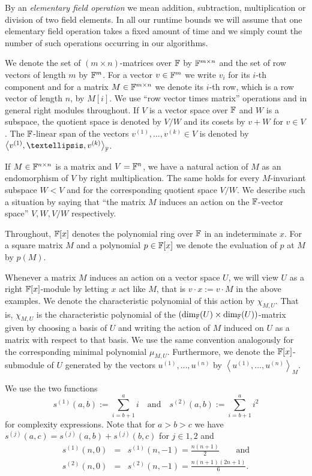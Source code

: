 By an \emph{elementary field operation} 
%
we mean addition, subtraction, multiplication or division of two field 
elements.
In all our runtime bounds we will assume that one elementary
field operation takes a fixed amount of time and we simply count
the number of such operations occurring in our algorithms.

We denote the set of $(m \times n)$-matrices over $\mathbb{F}$ by $\mathbb{F}^{m \times n}$
and the set of row vectors of length $m$ by $\mathbb{F}^m$. For a vector
$v \in \mathbb{F}^m$ we write $v_i$ for its $i$-th component and for a matrix 
$M \in \mathbb{F}^{m \times n}$ we denote its $i$-th row, which is
a row vector of length $n$, by $M[i]$. We use ``row vector
times matrix'' operations and in general right modules throughout.
If $V$ is a vector space over $\mathbb{F}$ and $W$ is a subspace, the
quotient space is denoted by $V/W$ and its cosets by
$v+W$ for $v \in V$. The $\mathbb{F}$-linear span of the vectors
$v^{(1)}, \ldots, v^{(k)} \in V$ is denoted by 
$\left< v^{(1)}, \ldots, v^{(k)}\right>_\F$.

If $M \in \mathbb{F}^{n \times n}$ is a matrix and $V = \mathbb{F}^n$, we have a
natural action of $M$ as an endomorphism of $V$ by right multiplication.
The same holds for every $M$-invariant subspace $W < V$ and for
the corresponding quotient space $V/W$. We describe such a situation
by saying that ``the matrix $M$ induces an action on the $\mathbb{F}$-vector space''
$V, W, V/W$ respectively.

Throughout, $\mathbb{F}[x]$ denotes
the polynomial ring over $\mathbb{F}$ in an indeterminate $x$. For a square matrix $M$ and
a polynomial $p \in \mathbb{F}[x]$ we denote the evaluation of $p$ at $M$
by $p(M)$.

Whenever a matrix $M$ induces an action on a vector space $U$, we
will view $U$ as a right $\mathbb{F}[x]$-module by letting $x$ act like $M$,
that is $v \cdot x := v\cdot M$ in the above examples. We denote the
characteristic polynomial of this action by $\chi_{M,U}$. That is,
$\chi_{M,U}$ is the characteristic polynomial 
of the $(\dim_{\mathbb{F}}(U) \times \dim_{\mathbb{F}}(U))$-matrix given by choosing 
a basis of $U$ and writing the
action of $M$ induced on $U$ as a matrix with respect to that basis.
We use the same convention analogously for the corresponding minimal
polynomial $\mu_{M,U}$. Furthermore, we denote the $\mathbb{F}[x]$-submodule of
$U$ generated by the vectors $u^{(1)}, \ldots, u^{(n)}$ by $\left< u^{(1)}, \ldots,
u^{(n)} \right>_M$.

We use the two functions 
\begin{equation}\label{si}
s^{(1)}(a,b) := \sum_{i=b+1}^a i\quad \mbox{and}\quad
s^{(2)}(a,b) := \sum_{i=b+1}^a i^2
\end{equation}
for complexity expressions.
Note that for $a > b > c$ we have $s^{(j)}(a,c) = s^{(j)}(a,b) + s^{(j)}(b,c)$
for $j \in {1,2}$ and 
\begin{eqnarray}
\label{formels1}
s^{(1)}(n,0) &=& s^{(1)}(n,-1) = \frac{n(n+1)}{2}
\qquad\mbox{and} \\
\label{formels2}
s^{(2)}(n,0) &=& s^{(2)}(n,-1) = \frac{n(n+1)(2n+1)}{6}.
\end{eqnarray}

